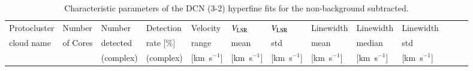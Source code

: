 \documentclass[longauth]{aa} %
\newcommand{\tdust}{\mbox{$T_{\rm dust}$}}
\newcommand{\vlsr}{\mbox{$V_{\rm LSR}$\,}}
\newcommand{\lbol}{\ensuremath{L_{\mathrm{bol}}\xspace}}        %
\begin{document}
\begin{appendix}
\begin{table}[htbp!]
\centering
\begin{threeparttable}[c]
\caption{Characteristic parameters of the DCN (3-2) hyperfine fits for the non-background subtracted.}
\label{tabappendix:dcnfits_average}
 \begin{tabular}{lllllllllllll}
\hline \noalign {\smallskip}
Protocluster         & Number\tnote{1}  & Number\tnote{2}   & Detection\tnote{2} & Velocity\tnote{3} & \vlsr\tnote{3}   & \vlsr\tnote{3}    & Linewidth\tnote{3}  & Linewidth\tnote{3}   &  Linewidth\tnote{3}  \\ 
cloud name & of Cores & detected    & rate [\%]   & range    & mean   & std     & mean  & median &  std \\
&  &(complex)        &  (complex)      & [km~s$^{-1}$]   & [km~s$^{-1}$] & [km~s$^{-1}$]  & [km~s$^{-1}$]& [km~s$^{-1}$] & [km~s$^{-1}$] \\


\end{tabular}
\end{threeparttable}
\end{table}
\end{appendix}
\end{document}
